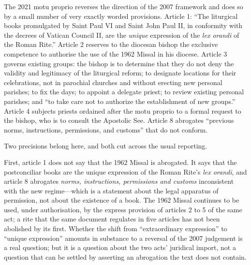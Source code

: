 The 2021 motu proprio reverses the direction of the 2007 framework and does so by a small number of very exactly worded provisions. Article 1: ``The liturgical books promulgated by Saint Paul VI and Saint John Paul II, in conformity with the decrees of Vatican Council II, are the \emph{unique} expression of the \emph{lex orandi} of the Roman Rite.'' Article 2 reserves to the diocesan bishop the exclusive competence to authorise the use of the 1962 Missal in his diocese. Article 3 governs existing groups: the bishop is to determine that they do not deny the validity and legitimacy of the liturgical reform; to designate locations for their celebrations, not in parochial churches and without erecting new personal parishes; to fix the days; to appoint a delegate priest; to review existing personal parishes; and ``to take care not to authorize the establishment of new groups.'' Article 4 subjects priests ordained after the motu proprio to a formal request to the bishop, who is to consult the Apostolic See. Article 8 abrogates ``previous norms, instructions, permissions, and customs'' that do not conform.

Two precisions belong here, and both cut across the usual reporting.

First, article 1 does not say that the 1962 Missal is abrogated. It says that the postconciliar books are the unique expression of the Roman Rite's \emph{lex orandi}, and article 8 abrogates \emph{norms, instructions, permissions and customs} inconsistent with the new regime---which is a statement about the legal apparatus of permission, not about the existence of a book. The 1962 Missal continues to be used, under authorisation, by the express provision of articles 2 to 5 of the same act; a rite that the same document regulates in five articles has not been abolished by its first. Whether the shift from ``extraordinary expression'' to ``unique expression'' amounts in substance to a reversal of the 2007 judgement is a real question; but it is a question about the two acts' juridical import, not a question that can be settled by asserting an abrogation the text does not contain.


